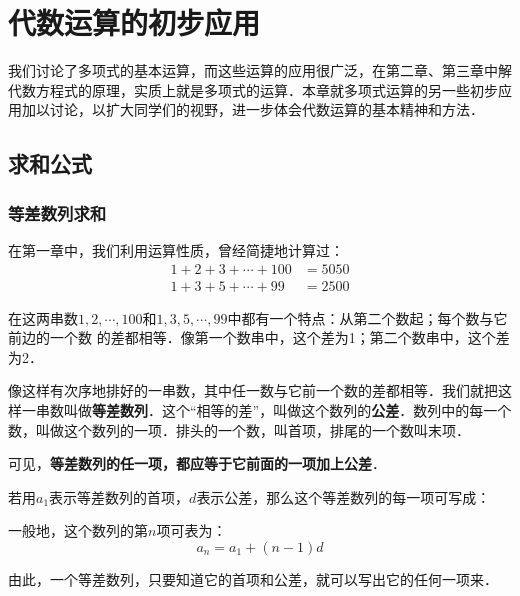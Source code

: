 \chapter{代数运算的初步应用}

我们讨论了多项式的基本运算，而这些运算的应用很广泛，在第二章、第三章中解代数方程式的原理，实质上就是多项式的运算．本章就多项式运算的另一些初步应用加以讨论，以扩大同学们的视野，进一步体会代数运算的基本精神和方法．
\section{求和公式}
\subsection{等差数列求和}
在第一章中，我们利用运算性质，曾经简捷地计算过：
\[\begin{split}
    1+2+3+\cdots+100&=5050\\
    1+3+5+\cdots+99&=2500
\end{split}\]

在这两串数$1, 2,\cdots,100$和$1, 3, 5,\cdots,99$中都有一个特点：从第二个数起；每个数与它前边的一个数
的差都相等．像第一个数串中，这个差为1；第二个数串中，这个差为2．

像这样有次序地排好的一串数，其中任一数与它前一个数的差都相等．我们就把这样一串数叫做\textbf{等差数列}．这个“相等的差”，叫做这个数列的\textbf{公差}．数列中的每一个数，叫做这个数列的一项．排头的一个数，叫首项，排尾的一个数叫末项．

可见，\textbf{等差数列的任一项，都应等于它前面的一项加上公差}．

若用$a_1$表示等差数列的首项，$d$表示公差，那么这个等差数列的每一项可写成：
\begin{center}
\end{center}

一般地，这个数列的第$n$项可表为：
\[a_n=a_1+ (n-1) d\]

由此，一个等差数列，只要知道它的首项和公差，就可以写出它的任何一项来．

